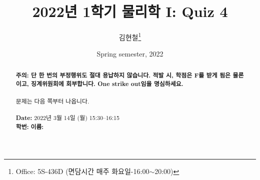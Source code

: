 \documentclass[floatfix,nofootinbib,superscriptaddress,fleqn,preprint]{revtex4}
\begin{document}
\title{\Large 2022년 1학기 물리학 I: Quiz 4}
\author{김현철\footnote{Office: 5S-436D (면담시간 매주
    화요일-16:00$\sim$20:00)}} 
\date{Spring semester, 2022}


\vspace{1.cm}
\begin{abstract}
\noindent \textbf{ {\color{red}주의}: \color{blue} 단 한 번의 부정행위도 절대
  용납하지 않습니다. 적발 시, 학점은 F를 받게 됨은 물론이고,
  징계위원회에 회부합니다. One strike out임을 명심하세요.}\\
\\
문제는 다음 쪽부터 나옵니다.  \\ \\
{\bf Date:} 2022년 3월 14일 (월) 15:30--16:15
\\
{\bf 학번:} \hspace{4cm}
{\bf 이름:} 

\end{abstract}
\maketitle
\end{document}
